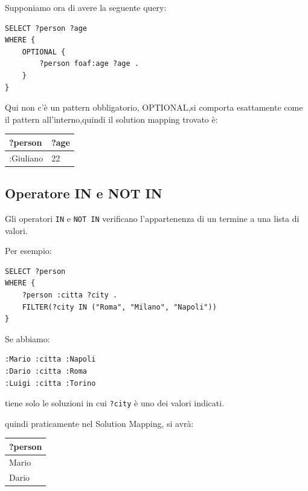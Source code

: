 Supponiamo ora di avere la seguente query:
\begin{lstlisting}
SELECT ?person ?age
WHERE {
    OPTIONAL {
        ?person foaf:age ?age .
    }
}
\end{lstlisting}
Qui non c'è un pattern obbligatorio, OPTIONAL,si comporta esattamente come il pattern all'interno,quindi il solution mapping trovato è:
\begin{table}[h]
\centering
\begin{tabular}{|l|l|}
\hline
\textbf{?person} & \textbf{?age} \\ \hline
:Giuliano          & 22      \\ \hline
\end{tabular}
\end{table}

\subsection{Operatore IN e NOT IN}

Gli operatori \texttt{IN} e \texttt{NOT IN} verificano l'appartenenza di un termine a una lista di valori.

\vspace{0.5em}
\noindent Per esempio:

\begin{lstlisting}
SELECT ?person
WHERE {
    ?person :citta ?city .
    FILTER(?city IN ("Roma", "Milano", "Napoli"))
}
\end{lstlisting}

\noindent Se abbiamo:

\begin{lstlisting}
:Mario :citta :Napoli
:Dario :citta :Roma
:Luigi :citta :Torino
\end{lstlisting}

\noindent tiene solo le soluzioni in cui \texttt{?city} è uno dei valori indicati.

\vspace{0.5em}
\noindent quindi praticamente nel Solution Mapping, si avrà:

\vspace{0.8em}
\begin{table}[h]
\centering
\begin{tabular}{|l|}
\hline
\textbf{?person} \\ \hline
Mario \\ \hline
Dario \\ \hline
\end{tabular}
\end{table}

